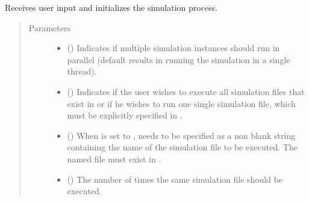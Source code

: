 \documentclass[letterpaper,10pt,english]{sphinxmanual}
\begin{document}
\begin{fulllineitems}
\label{\detokenize{app:app.hive_simulation.main}}
Receives user input and initializes the simulation process.
\begin{quote}\begin{description}
\item[{Parameters}] \leavevmode\begin{itemize}
\item {} 
 () \textendash{} Indicates if multiple simulation instances should run in parallel
(default results in running the simulation in a
single thread).

\item {} 
 () \textendash{} Indicates if the user wishes to execute all simulation files
that exist in
{\hyperref[\detokenize{app:app.environment_settings.SIMULATION_ROOT}]{}} or
if he wishes to run one single simulation file, which must be
explicitly specified in .

\item {} 
 (\sphinxstyleliteralemphasis{\sphinxupquote{{[}}}\sphinxstyleliteralemphasis{\sphinxupquote{{]}}}) \textendash{} When  is set to ,  needs to be specified as a
non blank string containing the name of the simulation file to
be executed. The named file must exist in
{\hyperref[\detokenize{app:app.environment_settings.SIMULATION_ROOT}]{}}.

\item {} 
 () \textendash{} The number of times the same simulation file should be executed.


\end{itemize}
\end{description}
\end{quote}
\end{fulllineitems}
\end{document}
